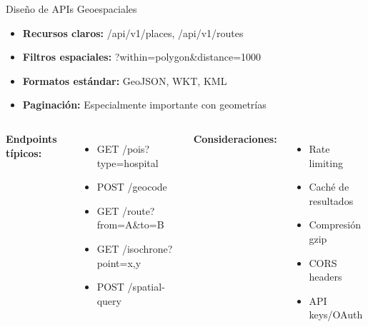 \documentclass[10pt,aspectratio=169]{beamer}
\newcommand{\conceptbox}[2]{
\begin{tcolorbox}[colframe=usachblue,colback=blue!5,title=#1,fonttitle=\bfseries]
#2
\end{tcolorbox}
}
\begin{document}
\begin{frame}{Diseño de APIs Geoespaciales}
    \conceptbox{Principios REST para Geo-APIs}{
        \begin{itemize}
            \item \textbf{Recursos claros:} /api/v1/places, /api/v1/routes
            \item \textbf{Filtros espaciales:} ?within=polygon\&distance=1000
            \item \textbf{Formatos estándar:} GeoJSON, WKT, KML
            \item \textbf{Paginación:} Especialmente importante con geometrías
        \end{itemize}
    }
    
    \begin{columns}[T]
        \textbf{Endpoints típicos:}
        \begin{itemize}
            \item GET /pois?type=hospital
            \item POST /geocode
            \item GET /route?from=A\&to=B
            \item GET /isochrone?point=x,y
            \item POST /spatial-query
        \end{itemize}
        
        \textbf{Consideraciones:}
        \begin{itemize}
            \item Rate limiting
            \item Caché de resultados
            \item Compresión gzip
            \item CORS headers
            \item API keys/OAuth
        \end{itemize}
    \end{columns}
\end{frame}
\end{document}
